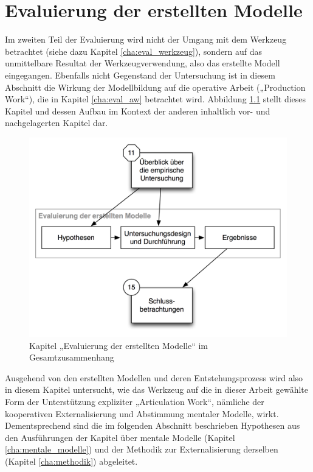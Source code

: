 

\chapter{Evaluierung der erstellten Modelle} %
\label{cha:eval_modell}

Im zweiten Teil der Evaluierung wird nicht der Umgang mit dem Werkzeug betrachtet (siehe dazu Kapitel \ref{cha:eval_werkzeug}), sondern auf das unmittelbare Resultat der Werkzeugverwendung, also das erstellte Modell eingegangen. Ebenfalls nicht Gegenstand der Untersuchung ist in diesem Abschnitt die Wirkung der Modellbildung auf die operative Arbeit („Production Work“), die in Kapitel \ref{cha:eval_aw} betrachtet wird. Abbildung \ref{fig:img_Kontextgrafiken_k13} stellt dieses Kapitel und dessen Aufbau im Kontext der anderen inhaltlich vor- und nachgelagerten Kapitel dar.


\begin{figure}[htbp]
	\centering
		\includegraphics[scale=0.6]{img/Kontextgrafiken/k13.png}
	\caption{Kapitel „Evaluierung der erstellten Modelle“ im Gesamtzusammenhang}
	\label{fig:img_Kontextgrafiken_k13}
\end{figure}


Ausgehend von den erstellten Modellen und deren Entstehungsprozess wird also in diesem Kapitel untersucht, wie das Werkzeug auf die in dieser Arbeit gewählte Form der Unterstützung expliziter „Articulation Work“, nämliche der kooperativen Externalisierung und Abstimmung mentaler Modelle, wirkt. Dementsprechend sind die im folgenden Abschnitt beschrieben Hypothesen aus den Ausführungen der Kapitel über mentale Modelle (Kapitel \ref{cha:mentale_modelle}) und der Methodik zur Externalisierung derselben (Kapitel \ref{cha:methodik}) abgeleitet. 

